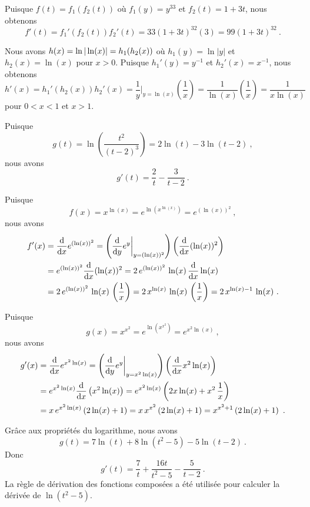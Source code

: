 { Puisque $f(t) = f_1(f_2(t))$ où $f_1(y) = y^{33}$ et
$f_2(t) = 1+3t$, nous obtenons
\[
f'(t) = f_1'(f_2(t)) f_2'(t) = 33(1+3t)^{32} \left( 3\right)
= 99(1+3t)^{32} \ . 
\]

 Nous avons $\DS h(x) = \ln|\ln(x)| = h_1(h_2(x))$ où
$h_1(y) = \ln|y|$ et $h_2(x) = \ln(x)$ pour $x>0$.  Puisque
$h_1'(y) = y^{-1}$ et $h_2'(x) = x^{-1}$, nous obtenons
\[
h'(x) = h_1'(h_2(x)) h_2'(x) = \frac{1}{y}\bigg|_{y=\ln(x)}
\left(\frac{1}{x}\right)
= \frac{1}{\ln(x)} \left(\frac{1}{x}\right)
= \frac{1}{x\ln(x)}
\]
pour $0<x<1$ et $x>1$.

 Puisque
\[
g(t) = \ln\left(\frac{t^2}{(t-2)^3}\right) = 2\ln(t) - 3 \ln(t-2) \ ,
\]
nous avons
\[
g'(t) = \frac{2}{t} - \frac{3}{t-2}  \ .
\]

 Puisque
\[
f(x) = x^{\ln(x)} = e^{\ln(x^{\ln(x)})} = e^{(\ln(x))^2} \ ,
\]
nous avons
\begin{align*}
f'(x) &= \dfdx{e^{(\ln(x))^2}}{x}
=\left(\dfdx{e^y}{y}\bigg|_{y=(\ln(x))^2}\right)
\left(\dfdx{ (\ln(x))^2}{x}\right) \\
& = e^{(\ln(x))^2} \dfdx{(\ln(x))^2}{x}
= 2\, e^{(\ln(x))^2} \, \ln(x)\,\dfdx{\ln(x)}{x} \\
&= 2 \, e^{(\ln(x))^2} \, \ln(x)\,\left(\frac{1}{x}\right)
= 2\, x^{\ln(x)} \, \ln(x)\,\left(\frac{1}{x}\right)
= 2\, x^{\ln(x)-1}\,\ln(x) \ .
\end{align*}

 Puisque
\[
g(x) = x^{x^2} = e^{\ln(x^{x^2})} = e^{x^2 \ln(x)} \ ,
\]
nous avons
\begin{align*}
g'(x) &= \dfdx{e^{x^2\ln(x)}}{x}
= \left(\dfdx{e^y}{y}\bigg|_{y=x^2\ln(x)}\right)
\left(\dfdx{x^2 \ln(x)}{x}\right) \\
&= e^{x^2\ln(x)} \dfdx{\left( x^2\ln(x) \right)}{x}
 = e^{x^2\ln(x)} \left(2x\ln(x) + x^2\, \frac{1}{x}\right) \\
 &= x \, e^{x^2\ln(x)} \left( 2\ln(x) + 1\right)
 = x\, x^{x^2} \left(2\ln(x) +1\right)
 = x^{x^2+1}\left(2\ln(x) + 1\right) \ .
\end{align*}

 Grâce aux propriétés du logarithme, nous avons
\[
g(t) = 7\ln(t) + 8\ln(t^2-5) - 5 \ln(t-2) \ .
\]
Donc
\[
g'(t) = \frac{7}{t} + \frac{16t}{t^2-5} - \frac{5}{t-2} \ .
\]
La règle de dérivation des fonctions composées a été utilisée pour
calculer la dérivée de $\ln(t^2-5)$.
}

